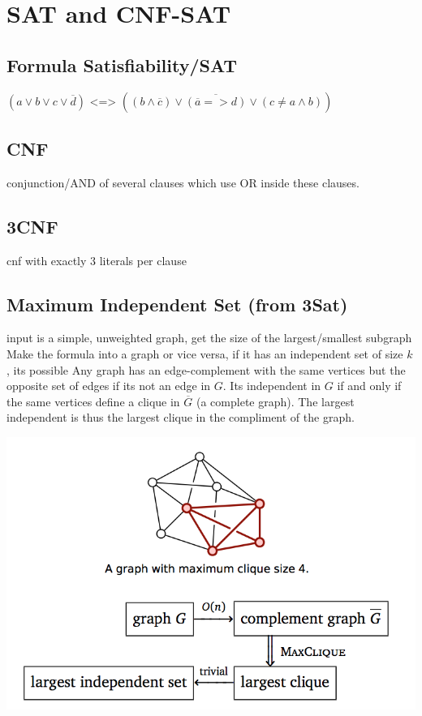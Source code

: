 \section{SAT and CNF-SAT}

\subsection{Formula Satisfiability/SAT}
$(a \vee b \vee c \vee \overbar{d})$ <=>  $((b \wedge \overbar{c}) \vee \overbar{ ( \overbar{a} => d) } \vee (c \neq a \wedge b)) $

\subsection{CNF}
conjunction/AND of several clauses which use OR inside these clauses.
\subsection{3CNF}
cnf with exactly 3 literals per clause

\subsection{Maximum Independent Set (from 3Sat)}
input is a simple, unweighted graph, get the size of the largest/smallest subgraph
Make the formula into a graph or vice versa, if it has an independent set of size $k$, its possible
Any graph has an edge-complement with the same vertices but the opposite set of edges if its not an edge in $G$. Its independent in $G$ if and only if the same vertices define a clique in $\overbar{G}$ (a complete graph). The largest independent is thus the largest clique in the compliment of the graph.

\includegraphics[width=\linewidth]{images/maxclique.png}

